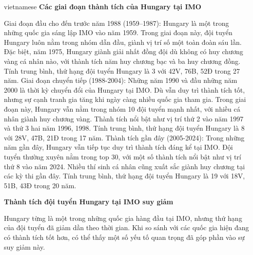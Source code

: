 \documentclass{article}
\begin{document}
\begin{otherlanguage*}{vietnamese}
\textbf{Các giai đoạn thành tích của Hungary tại IMO}
\begin{itemize}[topsep=0pt, partopsep=0pt, itemsep=0pt]
    \ii Giai đoạn đầu cho đến trước năm 1988 (1959–1987): Hungary là một trong những quốc gia sáng lập IMO vào năm 1959.
    Trong giai đoạn này, đội tuyển Hungary luôn nằm trong nhóm dẫn đầu, giành vị trí số một toàn đoàn sáu lần.
    Đặc biệt, năm 1975, Hungary giành giải nhất đồng đội dù không có huy chương vàng cá nhân nào, với thành tích năm huy chương bạc và ba huy chương đồng.
    Tính trung bình, thứ hạng đội tuyển Hungary là 3 với 42V, 76B, 52Đ trong 27 năm.
    \ii Giai đoạn chuyển tiếp (1988-2004): Những năm 1990 và đầu những năm 2000 là thời kỳ chuyển đổi của Hungary tại IMO.
    Dù vẫn duy trì thành tích tốt, nhưng sự cạnh tranh gia tăng khi ngày càng nhiều quốc gia tham gia.
    Trong giai đoạn này, Hungary vẫn nằm trong nhóm 10 đội tuyển mạnh nhất, với nhiều cá nhân giành huy chương vàng.
    Thành tích nổi bật như vị trí thứ 2 vào năm 1997 và thứ 3 hai năm 1996, 1998.
    Tính trung bình, thứ hạng đội tuyển Hungary là 8 với 28V, 47B, 21Đ trong 17 năm.
    \ii Thành tích gần đây (2005-2024): Trong những năm gần đây, Hungary vẫn tiếp tục duy trì thành tích đáng kể tại IMO.
    Đội tuyển thường xuyên nằm trong top 30, với một số thành tích nổi bật như vị trí thứ 8 vào năm 2024.
    Nhiều thí sinh cá nhân cũng xuất sắc giành huy chương tại các kỳ thi gần đây.
    Tính trung bình, thứ hạng đội tuyển Hungary là 19 với 18V, 51B, 43Đ trong 20 năm.
\end{itemize}

\textbf{Thành tích đội tuyển Hungary tại IMO suy giảm}

Hungary từng là một trong những quốc gia hàng đầu tại IMO, nhưng thứ hạng của đội tuyển đã giảm dần theo thời gian.
Khi so sánh với các quốc gia hiện đang có thành tích tốt hơn, có thể thấy một số yếu tố quan trọng đã góp phần vào sự suy giảm này.


\end{otherlanguage*}
\end{document}
